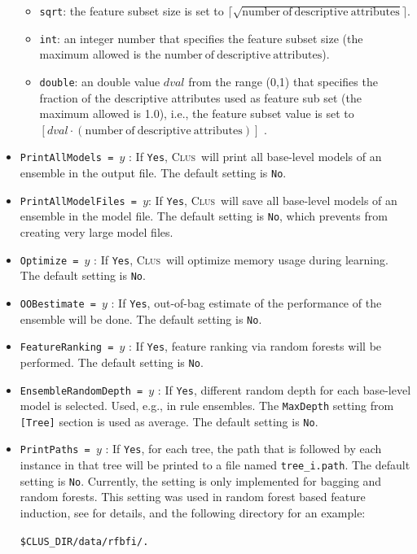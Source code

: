 \documentclass[a4paper]{report}
\newcommand{\clus}{\textsc{Clus}}
\begin{document}
\begin{itemize}
\begin{itemize}
		\item \texttt{sqrt}: the feature subset size is set to $\lceil{\sqrt{\mathrm{number\ of\ descriptive\ attributes}}}\rceil$.
		\item \texttt{int}: an integer number that specifies the feature subset size (the maximum allowed is the $\mathrm{number\ of\ descriptive\ attributes}$).
		\item \texttt{double}: an double value $dval$ from the range (0,1) that specifies the fraction of the descriptive attributes used as feature sub set (the maximum allowed is 1.0), i.e., the feature subset value is set to $[{dval \cdot (\mathrm{number\ of\ descriptive\ attributes})}]$ .
	\end{itemize}
	\item {\tt PrintAllModels = $y$} : If \texttt{Yes}, \clus\ will print all base-level models of an ensemble in the output file. The default setting is \texttt{No}.
	\item {\tt PrintAllModelFiles = $y$}: If \texttt{Yes}, \clus\ will save all base-level models of an ensemble in the model file. The default setting is \texttt{No}, which prevents from creating very large model files.
	\item {\tt Optimize = $y$} : If \texttt{Yes}, \clus\ will optimize memory usage during learning. The default setting is \texttt{No}.
	\item {\tt OOBestimate = $y$} : If \texttt{Yes}, out-of-bag estimate of the performance of the ensemble will be done. The default setting is \texttt{No}.
	\item {\tt FeatureRanking = $y$} : If \texttt{Yes}, feature ranking via random forests will be performed. The default setting is \texttt{No}.
	\item {\tt EnsembleRandomDepth = $y$} : If \texttt{Yes}, different random depth for each base-level model is selected. Used, e.g., in rule ensembles. The \texttt{MaxDepth} setting from \texttt{[Tree]} section is used as average. The default setting is \texttt{No}.
	\item {\tt PrintPaths = $y$} : If \texttt{Yes}, for each tree, the path that is followed by each instance in that tree will be printed to a file named {\tt tree\_i.path}.  The default setting is \texttt{No}. Currently, the setting is only implemented for bagging and random forests. This setting was used in random forest based feature induction, see \cite{Vens2011} for details, and the following directory for an example:  
\begin{flushleft}
\verb^$CLUS_DIR/data/rfbfi/.^
\end{flushleft}


	
	 
\end{itemize}
\end{document}

